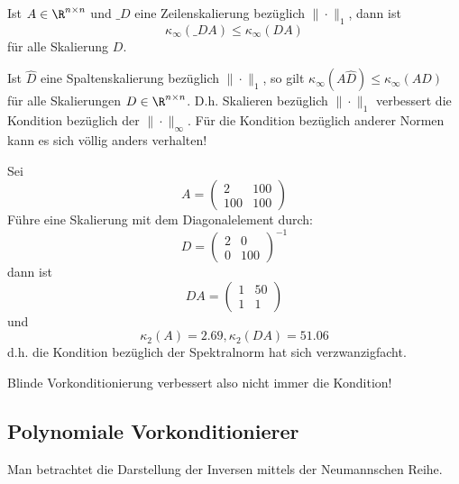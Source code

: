 \documentclass[a4paper]{scrartcl}
\numberwithin{equation}{section}
\begin{document}
\begin{lem}
	\label{lem:6.2}
	Ist $A\in \R^{n\times n}$ und $\_D$ eine Zeilenskalierung bezüglich $\|\cdot\|_1$, dann ist
	\[
		\kappa_\infty(\_D A) \le \kappa_\infty (DA)
	\]
	für alle Skalierung $D$.
	\begin{note}
		Ist $\hat D$ eine Spaltenskalierung bezüglich $\|\cdot\|_1$, so gilt $\kappa_\infty (A\hat D) \le \kappa_\infty(AD)$ für alle Skalierungen $D\in \R^{n\times n}$.
		D.h. Skalieren bezüglich $\|\cdot\|_1$ verbessert die Kondition bezüglich der $\|\cdot\|_\infty$.
		Für die Kondition bezüglich anderer Normen kann es sich völlig anders verhalten!
	\end{note}
\end{lem}

\begin{ex}
	\label{ex:6.3}
	Sei
	\[
		A = \begin{pmatrix}2&100\\100&100\end{pmatrix}
	\]
	Führe eine Skalierung mit dem Diagonalelement durch:
	\[
		D =\begin{pmatrix}2&0\\0&100\end{pmatrix}^{-1}
	\]
	dann ist
	\[
		DA = \begin{pmatrix}1&50\\1&1\end{pmatrix}
	\]
	und
	\[
		\kappa_2(A) = 2.69, \kappa_2(DA) = 51.06
	\]
	d.h. die Kondition bezüglich der Spektralnorm hat sich verzwanzigfacht.

	Blinde Vorkonditionierung verbessert also nicht immer die Kondition!
\end{ex}


\subsection{Polynomiale Vorkonditionierer}


Man betrachtet die Darstellung der Inversen mittels der Neumannschen Reihe.
\end{document}
